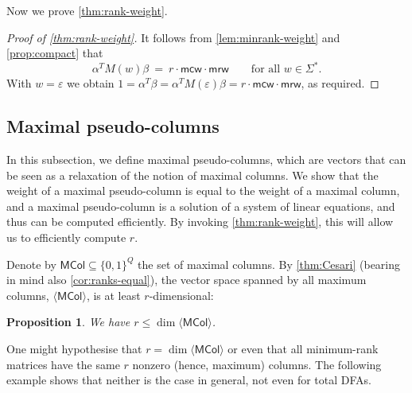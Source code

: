 \documentclass[11pt,a4paper]{amsart}
\newcommand{\spn}[1]{\mathord{\langle #1 \rangle}}
\newcommand{\mcw}{\mathsf{mcw}}
\newcommand{\mrw}{\mathsf{mrw}}
\newcommand{\MCol}{\mathsf{MCol}}
\theoremstyle{plain}
\newtheorem{prop}[thm]{Proposition}
\theoremstyle{definition}
\theoremstyle{defC}
\theoremstyle{thmC}
\theoremstyle{plain}
\numberwithin{equation}{section}
\begin{document}
\noindent
Now we prove \autoref{thm:rank-weight}.

\begin{proof}[Proof of \autoref{thm:rank-weight}]
It follows from \autoref{lem:minrank-weight} and \autoref{prop:compact} that
\[
 \alpha^T M(w) \beta \ = \ r \cdot \mcw \cdot \mrw \qquad \text{for all $w \in \Sigma^*$.}
\]
With $w = \varepsilon$ we obtain $1 = \alpha^T \beta = \alpha^T M(\varepsilon) \beta = r \cdot \mcw \cdot \mrw$, as required.
\end{proof}

\subsection{Maximal pseudo-columns}\label{subsec:pseudocolumns}

In this subsection, we define maximal pseudo-columns, which are vectors that can be seen as a relaxation of the notion of maximal columns. We show that the weight of a maximal pseudo-column is equal to the weight of a maximal column, and a maximal pseudo-column is a solution of a system of linear equations, and thus can be computed efficiently. By invoking \autoref{thm:rank-weight}, this will allow us to efficiently compute $r$.

Denote by $\MCol \subseteq \{0,1\}^Q$ the set of maximal columns.
By \autoref{thm:Cesari} (bearing in mind also \autoref{cor:ranks-equal}), the vector space spanned by all maximum columns, $\spn{\MCol}$, is at least $r$-dimensional:
\begin{prop} \label{prop:r<=MC}
We have $r \le \dim \spn{\MCol}$.
\end{prop}

\noindent
One might hypothesise that $r = \dim \spn{\MCol}$ or even that all minimum-rank matrices have the same $r$ nonzero (hence, maximum) columns.
The following example shows that neither is the case in general, not even for total DFAs.
\end{document}
